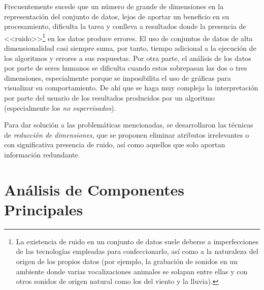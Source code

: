 Frecuentemente sucede que un número de grande de dimensiones en la representación del conjunto de datos, lejos de aportar un beneficio en su procesamiento, dificulta la tarea y conlleva a resultados donde la presencia de <<ruido>>\footnote{La existencia de ruido en un conjunto de datos suele deberse a imperfecciones de las tecnologías empleadas para confeccionarlo, así como a la naturaleza del origen de los propios datos (por ejemplo, la grabación de sonidos en un ambiente donde varias vocalizaciones animales se solapan entre ellas y con otros sonidos de origen natural como los del viento y la lluvia).} en los datos produce errores.
El uso de conjuntos de datos de alta dimensionalidad casi siempre suma, por tanto, tiempo adicional a la ejecución de los algoritmos y errores a sus respuestas.
Por otra parte, el análisis de los datos por parte de seres humanos se dificulta cuando estos sobrepasan las dos o tres dimensiones, especialmente porque se imposibilita el uso de gráficas para visualizar su comportamiento.
De ahí que se haga muy compleja la interpretación por parte del usuario de los resultados producidos por un algoritmo (especialmente los \textit{no supervisados}).

Para dar solución a las problemáticas mencionadas, se desarrollaron las técnicas de \textit{reducción de dimensiones}, que se proponen eliminar atributos irrelevantes o con significativa presencia de ruido, así como aquellos que solo aportan información redundante.

\section{Análisis de Componentes Principales}\label{subsec:PCA}


%